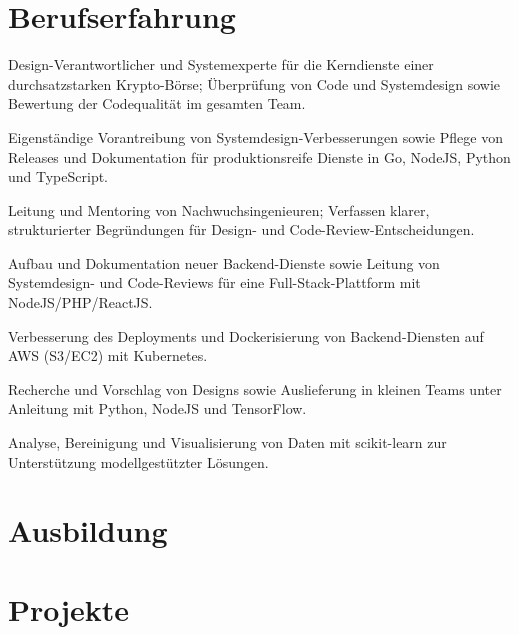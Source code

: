 \documentclass[11pt,a4paper]{resume}
\begin{document}
\section{Berufserfahrung}

\bullets
  \item Design-Verantwortlicher und Systemexperte für die Kerndienste einer durchsatzstarken Krypto-Börse; Überprüfung von Code und Systemdesign sowie Bewertung der Codequalität im gesamten Team.
  \item Eigenständige Vorantreibung von Systemdesign-Verbesserungen sowie Pflege von Releases und Dokumentation für produktionsreife Dienste in Go, NodeJS, Python und TypeScript.
  \item Leitung und Mentoring von Nachwuchsingenieuren; Verfassen klarer, strukturierter Begründungen für Design- und Code-Review-Entscheidungen.
\bulletsend
\vspace{3pt}
\bullets
  \item Aufbau und Dokumentation neuer Backend-Dienste sowie Leitung von Systemdesign- und Code-Reviews für eine Full-Stack-Plattform mit NodeJS/PHP/ReactJS.
  \item Verbesserung des Deployments und Dockerisierung von Backend-Diensten auf AWS (S3/EC2) mit Kubernetes.
\bulletsend
\vspace{3pt}
\bullets
  \item Recherche und Vorschlag von Designs sowie Auslieferung in kleinen Teams unter Anleitung mit Python, NodeJS und TensorFlow.
  \item Analyse, Bereinigung und Visualisierung von Daten mit scikit-learn zur Unterstützung modellgestützter Lösungen.
\bulletsend
\vspace{3pt}

\section{Ausbildung}

\vspace{2pt}

\section{Projekte}
\end{document}
